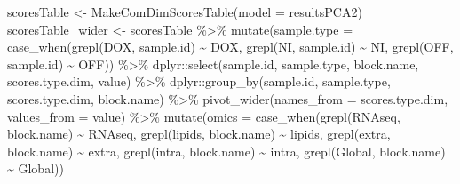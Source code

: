 \documentclass[
]{book}
\newenvironment{Shaded}{\begin{snugshade}}{\end{snugshade}}
\newcommand{\AttributeTok}[1]{\textcolor[rgb]{0.77,0.63,0.00}{#1}}
\newcommand{\FunctionTok}[1]{\textcolor[rgb]{0.00,0.00,0.00}{#1}}
\newcommand{\NormalTok}[1]{#1}
\newcommand{\OtherTok}[1]{\textcolor[rgb]{0.56,0.35,0.01}{#1}}
\newcommand{\SpecialCharTok}[1]{\textcolor[rgb]{0.00,0.00,0.00}{#1}}
\newcommand{\StringTok}[1]{\textcolor[rgb]{0.31,0.60,0.02}{#1}}
\begin{document}
\begin{Shaded}
\begin{Highlighting}[]
\NormalTok{  scoresTable }\OtherTok{\textless{}{-}} \FunctionTok{MakeComDimScoresTable}\NormalTok{(}\AttributeTok{model =}\NormalTok{ resultsPCA2)}
\NormalTok{  scoresTable\_wider }\OtherTok{\textless{}{-}}\NormalTok{ scoresTable }\SpecialCharTok{\%\textgreater{}\%}
    \FunctionTok{mutate}\NormalTok{(}\AttributeTok{sample.type =} \FunctionTok{case\_when}\NormalTok{(}\FunctionTok{grepl}\NormalTok{(}\StringTok{\textquotesingle{}DOX\textquotesingle{}}\NormalTok{, sample.id) }\SpecialCharTok{\textasciitilde{}} \StringTok{\textquotesingle{}DOX\textquotesingle{}}\NormalTok{,}
                                   \FunctionTok{grepl}\NormalTok{(}\StringTok{\textquotesingle{}NI\textquotesingle{}}\NormalTok{, sample.id) }\SpecialCharTok{\textasciitilde{}} \StringTok{\textquotesingle{}NI\textquotesingle{}}\NormalTok{,}
                                   \FunctionTok{grepl}\NormalTok{(}\StringTok{\textquotesingle{}OFF\textquotesingle{}}\NormalTok{, sample.id) }\SpecialCharTok{\textasciitilde{}} \StringTok{\textquotesingle{}OFF\textquotesingle{}}\NormalTok{)) }\SpecialCharTok{\%\textgreater{}\%}
\NormalTok{    dplyr}\SpecialCharTok{::}\FunctionTok{select}\NormalTok{(sample.id, sample.type, block.name, scores.type.dim, value) }\SpecialCharTok{\%\textgreater{}\%}
\NormalTok{    dplyr}\SpecialCharTok{::}\FunctionTok{group\_by}\NormalTok{(sample.id, sample.type, scores.type.dim, block.name) }\SpecialCharTok{\%\textgreater{}\%}
    \FunctionTok{pivot\_wider}\NormalTok{(}\AttributeTok{names\_from =}\NormalTok{ scores.type.dim, }\AttributeTok{values\_from =}\NormalTok{ value) }\SpecialCharTok{\%\textgreater{}\%}
    \FunctionTok{mutate}\NormalTok{(}\AttributeTok{omics =} \FunctionTok{case\_when}\NormalTok{(}\FunctionTok{grepl}\NormalTok{(}\StringTok{\textquotesingle{}RNAseq\textquotesingle{}}\NormalTok{, block.name) }\SpecialCharTok{\textasciitilde{}} \StringTok{\textquotesingle{}RNAseq\textquotesingle{}}\NormalTok{,}
                             \FunctionTok{grepl}\NormalTok{(}\StringTok{\textquotesingle{}lipids\textquotesingle{}}\NormalTok{, block.name) }\SpecialCharTok{\textasciitilde{}} \StringTok{\textquotesingle{}lipids\textquotesingle{}}\NormalTok{,}
                             \FunctionTok{grepl}\NormalTok{(}\StringTok{\textquotesingle{}extra\textquotesingle{}}\NormalTok{, block.name) }\SpecialCharTok{\textasciitilde{}} \StringTok{\textquotesingle{}extra\textquotesingle{}}\NormalTok{,}
                             \FunctionTok{grepl}\NormalTok{(}\StringTok{\textquotesingle{}intra\textquotesingle{}}\NormalTok{, block.name) }\SpecialCharTok{\textasciitilde{}} \StringTok{\textquotesingle{}intra\textquotesingle{}}\NormalTok{,}
                             \FunctionTok{grepl}\NormalTok{(}\StringTok{\textquotesingle{}Global\textquotesingle{}}\NormalTok{, block.name) }\SpecialCharTok{\textasciitilde{}} \StringTok{\textquotesingle{}Global\textquotesingle{}}\NormalTok{))}


\end{Highlighting}
\end{Shaded}
\end{document}
